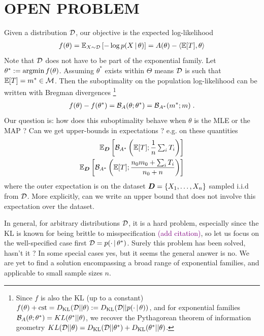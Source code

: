 \documentclass[twoside]{article}
\let\oldsection\section
\renewcommand{\section}[1]{\oldsection{\texorpdfstring{\uppercase{#1}}{#1}}}
\newcommand{\tocite}{\textcolor{purple}{(add citation)}}
\newcommand*{\expect}[2][]{\ensuremath{\mathbb{E}_{#1} \left[ #2 \right] }} %
\newcommand{\cond}{\,\vert\,}
\newcommand{\logpart}{A}
\newcommand{\bregman}{\cB_\logpart}
\newcommand{\bregmanconj}{\cB_{\logpart^*}}
\newcommand{\nat}{\theta}
\newcommand{\m}{m}
\newcommand{\meanp}{\m}
\begin{document}
\section{Open Problem}
Given a distribution ${\mathcal D}$, our objective is the expected log-likelihood 
\begin{align}
	f(\nat) = \expect[X \sim \cD]{-\log p(X \cond \nat)} 
	 = \logpart(\nat) - \langle \E[T] , \nat \rangle
\end{align}
Note that ${\mathcal D}$ does not have to be part of the exponential family.
Let $\nat^* := \argmin f(\nat)$.
Assuming $\nat^*$ exists within $\Theta$ means ${\mathcal D}$ is such that $\E[T] = \meanp^* \in \cM$.
Then the suboptimality on the population log-likelihood can be written with Bregman divergences
\footnote{
Since $f$ is also the KL (up to a constant)  $f(\nat) + \cst = \KL(\cD || \nat) := \KL(\cD || p(\cdot \cond \nat))$, 
and for exponential families $\bregman(\nat ; \nat^*) = KL(\nat^* || \nat)$, we recover the Pythagorean theorem of information geometry $KL(\cD || \nat) = \KL(\cD || \nat^*) + \KL(\nat^* || \nat)$.
}
\begin{align}
	 f(\nat) - f(\nat^*)
	 = \bregman(\nat ; \nat^*) 
	 = \bregmanconj(\m^* ; \m) \; .
\end{align}
Our question is: how does this suboptimality behave when $\nat$ is the MLE or the MAP ? Can we get upper-bounds in expectations ? e.g. on these quantities
\begin{align}
	\label{eq:bregmanMLE}
	\expect[\mD]{\bregmanconj \left (\E [T] ;  \inv{n}  \smallsum_i T_i \right )} \\
	\label{eq:bregmanMAP}
	\expect[\mD]{\bregmanconj \left (\E [T] ; \frac{n_0 \m_0 + \smallsum_i T_i}{n_0+n} \right )}
\end{align}
where the outer expectation is on the dataset ${\bm{D}} = \{X_1, \dots, X_n \}$ sampled i.i.d from ${\mathcal D}$.
More explicitly, can we write an upper bound that does not involve this expectation over the dataset.

In general, for arbitrary distributions ${\mathcal D}$, it is a hard problem, especially since the KL is known for being brittle to misspecification \tocite, so let us focus on the well-specified case first $\cD = p(\cdot \cond \nat^*)$. Surely this problem has been solved, hasn't it ?
In some special cases yes, but it seems the general answer is no. 
We are yet to find a solution encompassing a broad range of exponential families, and applicable to small sample sizes $n$.
\end{document}
